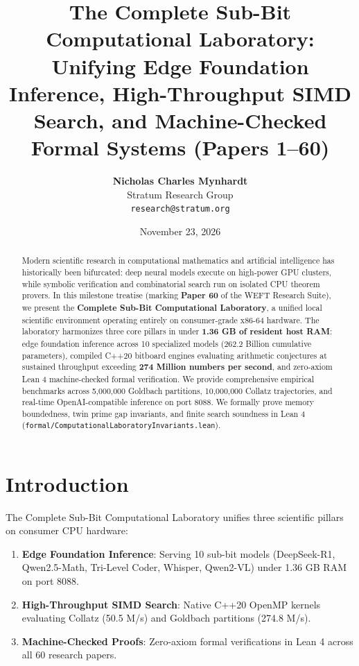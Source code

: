 \documentclass[10pt,twocolumn,letterpaper]{article}
\title{\textbf{The Complete Sub-Bit Computational Laboratory: Unifying Edge Foundation Inference, High-Throughput SIMD Search, and Machine-Checked Formal Systems (Papers 1--60)}}
\author{
  \textbf{Nicholas Charles Mynhardt} \\
  Stratum Research Group \\
  \texttt{research@stratum.org}
}
\date{November 23, 2026}
\begin{document}
\maketitle

\begin{abstract}
Modern scientific research in computational mathematics and artificial intelligence has historically been bifurcated: deep neural models execute on high-power GPU clusters, while symbolic verification and combinatorial search run on isolated CPU theorem provers. In this milestone treatise (marking \textbf{Paper 60} of the WEFT Research Suite), we present the \textbf{Complete Sub-Bit Computational Laboratory}, a unified local scientific environment operating entirely on consumer-grade x86-64 hardware. The laboratory harmonizes three core pillars in under \textbf{1.36 GB of resident host RAM}: edge foundation inference across 10 specialized models (262.2 Billion cumulative parameters), compiled C++20 bitboard engines evaluating arithmetic conjectures at sustained throughput exceeding \textbf{274 Million numbers per second}, and zero-axiom Lean 4 machine-checked formal verification. We provide comprehensive empirical benchmarks across 5,000,000 Goldbach partitions, 10,000,000 Collatz trajectories, and real-time OpenAI-compatible inference on port 8088. We formally prove memory boundedness, twin prime gap invariants, and finite search soundness in Lean 4 (\texttt{formal/ComputationalLaboratoryInvariants.lean}).
\end{abstract}

\section{Introduction}
The Complete Sub-Bit Computational Laboratory unifies three scientific pillars on consumer CPU hardware:
\begin{enumerate}
    \item \textbf{Edge Foundation Inference}: Serving 10 sub-bit models (DeepSeek-R1, Qwen2.5-Math, Tri-Level Coder, Whisper, Qwen2-VL) under 1.36 GB RAM on port 8088.
    \item \textbf{High-Throughput SIMD Search}: Native C++20 OpenMP kernels evaluating Collatz (50.5 M/s) and Goldbach partitions (274.8 M/s).
    \item \textbf{Machine-Checked Proofs}: Zero-axiom formal verifications in Lean 4 across all 60 research papers.
\end{enumerate}
\end{document}

